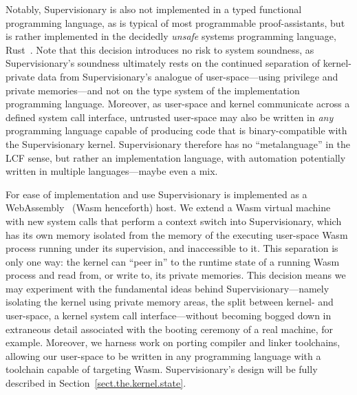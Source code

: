 \documentclass[a4paper, UKenglish, cleveref, autoref, thm-restate, colorlinks]{lipics-v2021}
\begin{document}
Notably, Supervisionary is also not implemented in a typed functional programming language, as is typical of most programmable proof-assistants, but is rather implemented in the decidedly \emph{unsafe} systems programming language, Rust~\cite{DBLP:phd/dnb/Jung20}.
Note that this decision introduces no risk to system soundness, as Supervisionary's soundness ultimately rests on the continued separation of kernel-private data from Supervisionary's analogue of user-space---using privilege and private memories---and not on the type system of the implementation programming language.
Moreover, as user-space and kernel communicate across a defined system call interface, untrusted user-space may also be written in \emph{any} programming language capable of producing code that is binary-compatible with the Supervisionary kernel.
Supervisionary therefore has no ``metalanguage'' in the LCF sense, but rather an implementation language, with automation potentially written in multiple languages---maybe even a mix.

For ease of implementation and use Supervisionary is implemented as a WebAssembly~\cite{DBLP:conf/pldi/HaasRSTHGWZB17} (Wasm henceforth) host.
We extend a Wasm virtual machine with new system calls that perform a context switch into Supervisionary, which has its own memory isolated from the memory of the executing user-space Wasm process running under its supervision, and inaccessible to it.
This separation is only one way: the kernel can ``peer in'' to the runtime state of a running Wasm process and read from, or write to, its private memories.
This decision means we may experiment with the fundamental ideas behind Supervisionary---namely isolating the kernel using private memory areas, the split between kernel- and user-space, a kernel system call interface---without becoming bogged down in extraneous detail associated with the booting ceremony of a real machine, for example.
Moreover, we harness work on porting compiler and linker toolchains, allowing our user-space to be written in any programming language with a toolchain capable of targeting Wasm.
Supervisionary's design will be fully described in Section~\ref{sect.the.kernel.state}.
\end{document}
